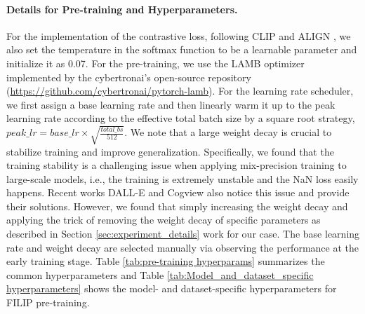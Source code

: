 \paragraph{Details for Pre-training and Hyperparameters.}  
For the implementation of the contrastive loss, following CLIP \citep{radford2021learning} and ALIGN \citep{jia2021scaling}, we also set the temperature in the softmax function to be a learnable parameter and initialize it as 0.07. 
For the pre-training, we use the LAMB optimizer implemented by the cybertronai's open-source repository (\url{https://github.com/cybertronai/pytorch-lamb}). 
For the learning rate scheduler, we first assign a base learning rate and then linearly warm it up to the peak learning rate according to the effective total batch size by a square root strategy, $peak\_lr=base\_lr \times \sqrt{\frac{total\_bs}{512}}$. 
We note that a large weight decay is crucial to stabilize training and improve generalization.
Specifically, we found that the training stability is a challenging issue when applying mix-precision training to large-scale models, i.e.,  the training is extremely unstable and the NaN loss easily happens. Recent works DALL-E \citep{ramesh2021zeroshot} and Cogview \citep{ding2021cogview} also notice this issue and provide their solutions. 
However, we found that simply increasing the weight decay and applying the trick of removing the weight decay of specific parameters as described in Section \ref{sec:experiment_details} work for our case.
The base learning rate and weight decay are selected manually via observing the performance at the early training stage.
Table \ref{tab:pre-training hyperparams} summarizes the common hyperparameters  and Table \ref{tab:Model_and_dataset_specific hyperparameters} shows the model- and dataset-specific hyperparameters for FILIP pre-training.





